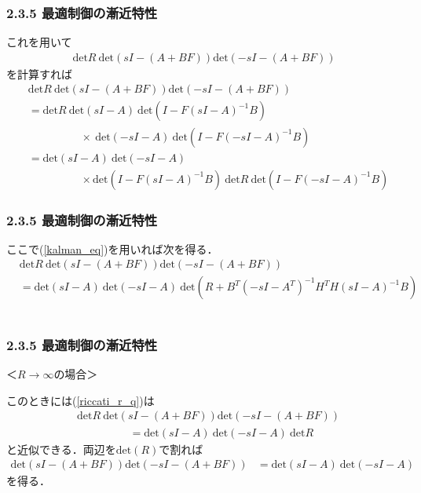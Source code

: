 \begin{frame}[t]
\frametitle{2.3.5 最適制御の漸近特性}
これを用いて
\begin{align}
	\mbox{det}R \ \mbox{det}({sI-(A + B F)})\mbox{det}({-sI-(A + B F)})
\nonumber
\end{align}
を計算すれば
\begin{align}
	& %
	\mbox{det}R \ \mbox{det}({sI-(A + B F)})\mbox{det}({-sI-(A + B F)})
\nonumber \\
		&= \mbox{det}R \ \mbox{det}(sI-A) \ \mbox{det}(I- F(sI-A)^{-1}B)
\nonumber \\
		&\hspace{2cm} \times
			\ \mbox{det}(-sI-A) \ \mbox{det}(I- F(-sI-A)^{-1}B)
\nonumber \\
		&= \mbox{det}(sI-A) \ \mbox{det}(-sI-A) \ 
\nonumber \\
		&\hspace{2cm} \times
			\mbox{det}(I- F(sI-A)^{-1}B) \ \mbox{det}R \ \mbox{det}(I- F(-sI-A)^{-1}B)
\end{align}
\end{frame}

\begin{frame}[t]
\frametitle{2.3.5 最適制御の漸近特性}
ここで(\ref{kalman_eq})を用いれば次を得る．
\begin{align}
	&
	\mbox{det}R \ \mbox{det}({sI-(A + B F)})\mbox{det}({-sI-(A + B F)})
\nonumber \\
		&= \mbox{det}(sI-A) \ \mbox{det}(-sI-A) \ 
			\mbox{det}(R + B^T (-sI - A^T)^{-1}H^T H (sI - A)^{-1} B)
\label{riccati_r_q}
\end{align}
\ \\
\end{frame}

\begin{frame}[t]
\frametitle{2.3.5 最適制御の漸近特性}
＜$R \rightarrow \infty$の場合＞

このときには(\ref{riccati_r_q})は
\begin{align}
	& %
	\mbox{det}R \ \mbox{det}({sI-(A + B F)})\mbox{det}({-sI-(A + B F)})
\nonumber \\
		&\hspace{2cm}
			= \mbox{det}(sI-A) \ \mbox{det}(-sI-A) \ 
			\mbox{det} R
\end{align}
と近似できる．両辺を$\mbox{det}(R )$で割れば
\begin{align}
	\mbox{det}({sI-(A + B F)})\mbox{det}({-sI-(A + B F)})
		&= \mbox{det}(sI-A) \ \mbox{det}(-sI-A) \ 
\end{align}
を得る．
\end{frame}

